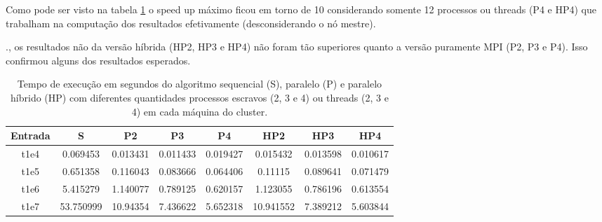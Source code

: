 \documentclass[12pt]{article}
\begin{document}
Como pode ser visto na tabela \ref{tab:results} o speed up máximo ficou em torno de 10 considerando somente 12 processos ou threads (P4 e HP4) que trabalham na computação dos resultados efetivamente (desconsiderando o nó mestre).

., os resultados não da versão híbrida (HP2, HP3 e HP4) não foram tão superiores quanto a versão puramente MPI (P2, P3 e P4). Isso confirmou alguns dos resultados esperados.


\begin{table}[H]
	\footnotesize
\begin{adjustbox}{center}
	\begin{tabular}{|c|c|ccc|ccc|}
		\hline
		Entrada & S         & P2       & P3       & P4       & HP2       & HP3      & HP4      \\
		\hline
		t1e4    & 0.069453  & 0.013431 & 0.011433 & 0.019427 & 0.015432  & 0.013598 & 0.010617 \\
		t1e5    & 0.651358  & 0.116043 & 0.083666 & 0.064406 & 0.11115   & 0.089641 & 0.071479 \\
		t1e6    & 5.415279  & 1.140077 & 0.789125 & 0.620157 & 1.123055  & 0.786196 & 0.613554 \\
		t1e7    & 53.750999 & 10.94354 & 7.436622 & 5.652318 & 10.941552 & 7.389212 & 5.603844 \\
		\hline
	\end{tabular}
      \end{adjustbox}
	\caption{Tempo de execução em segundos do algoritmo sequencial (S), paralelo (P) e paralelo híbrido (HP) com diferentes quantidades processos escravos (2, 3 e 4) ou threads (2, 3 e 4) em cada máquina do cluster.}
	\label{tab:results}
\end{table}


\end{document}
